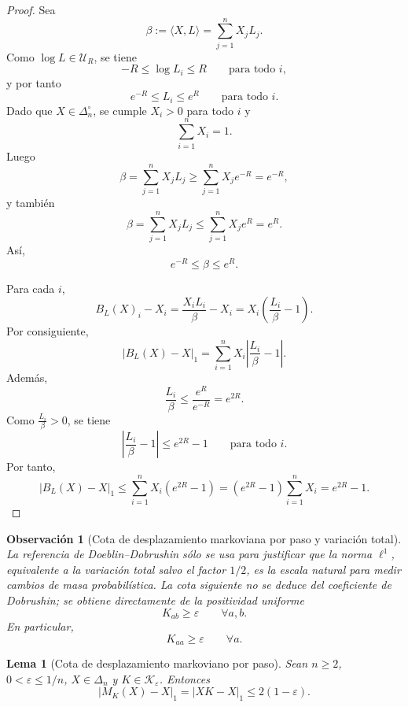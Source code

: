 \documentclass[12pt]{article}
\newtheorem{lema}{Lema}[section]
\newtheorem{observacion}{Observación}[section]
\begin{document}
\begin{proof}
Sea
\[
\beta:=\langle X,L\rangle=\sum_{j=1}^n X_jL_j.
\]
Como \(\log L\in\mathcal U_R\), se tiene
\[
-R\le \log L_i\le R
\qquad\text{para todo }i,
\]
y por tanto
\[
e^{-R}\le L_i\le e^R
\qquad\text{para todo }i.
\]
Dado que \(X\in\Delta_n^\circ\), se cumple \(X_i>0\) para todo \(i\) y
\[
\sum_{i=1}^n X_i=1.
\]
Luego
\[
\beta
=
\sum_{j=1}^n X_jL_j
\ge
\sum_{j=1}^n X_j e^{-R}
=
e^{-R},
\]
y también
\[
\beta
=
\sum_{j=1}^n X_jL_j
\le
\sum_{j=1}^n X_j e^R
=
e^R.
\]
Así,
\[
e^{-R}\le \beta\le e^R.
\]

Para cada \(i\),
\[
B_L(X)_i-X_i
=
\frac{X_iL_i}{\beta}-X_i
=
X_i\left(\frac{L_i}{\beta}-1\right).
\]
Por consiguiente,
\[
\left|B_L(X)-X\right|_1
=
\sum_{i=1}^n
X_i\left|\frac{L_i}{\beta}-1\right|.
\]
Además,
\[
\frac{L_i}{\beta}
\le
\frac{e^R}{e^{-R}}
=
e^{2R}.
\]
Como \(\frac{L_i}{\beta}>0\), se tiene
\[
\left|\frac{L_i}{\beta}-1\right|
\le
e^{2R}-1
\qquad\text{para todo }i.
\]
Por tanto,
\[
\left|B_L(X)-X\right|_1
\le
\sum_{i=1}^n
X_i(e^{2R}-1)
=
(e^{2R}-1)\sum_{i=1}^n X_i
=
e^{2R}-1.
\]
\end{proof}

\begin{observacion}[Cota de desplazamiento markoviana por paso y variación total]
La referencia de Doeblin--Dobrushin \citep{GaubertQu2014} sólo se usa para justificar que la norma \(\ell^1\), equivalente a la variación total salvo el factor \(1/2\), es la escala natural para medir cambios de masa probabilística. La cota siguiente no se deduce del coeficiente de Dobrushin; se obtiene directamente de la positividad uniforme
\[
K_{ab}\ge\varepsilon
\qquad\forall a,b.
\]
En particular,
\[
K_{aa}\ge\varepsilon
\qquad\forall a.
\]
\end{observacion}

\begin{lema}[Cota de desplazamiento markoviano por paso]\label{lem:cota_desplazamiento_markoviano}
Sean \(n\ge2\), \(0<\varepsilon\le 1/n\), \(X\in\Delta_n\) y \(K\in\mathcal K_\varepsilon\). Entonces
\[
\left|M_K(X)-X\right|_1
=
\left|XK-X\right|_1
\le
2(1-\varepsilon).
\]
\end{lema}
\end{document}
